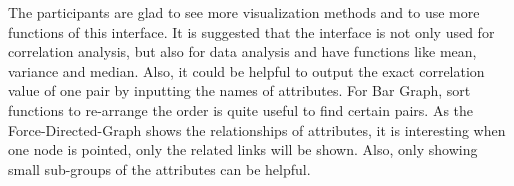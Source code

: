 The participants are glad to see more visualization methods and to use more functions of this interface. It is suggested that the interface is not only used for correlation analysis, but also for data analysis and have functions like mean, variance and median. Also, it could be helpful to output the exact correlation value of one pair by inputting the names of attributes. For Bar Graph, sort functions to re-arrange the order is quite useful to find certain pairs. As the Force-Directed-Graph shows the relationships of attributes, it is interesting when one node is pointed, only the related links will be shown. Also, only showing small sub-groups of the attributes can be helpful.